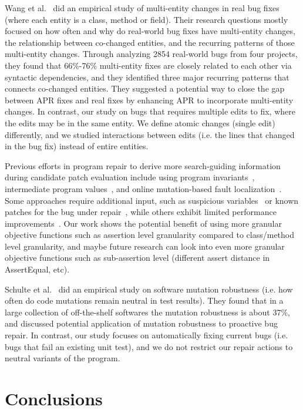 \documentclass[sigconf, timestamp-false, anonymous=true]{acmart}
\begin{document}
Wang et al.~\cite{wang2018} did an empirical study of multi-entity changes in real bug fixes 
(where each entity is a class, method or field). Their research questions mostly focused on 
how often and why do real-world bug fixes have multi-entity changes, the relationship 
between co-changed entities, and the recurring patterns of those multi-entity changes. 
Through analyzing 2854 real-world bugs from four projects, they found that 66\%-76\% 
multi-entity fixes are closely related to each other via syntactic dependencies, 
and they identified three major recurring patterns that connects co-changed entities. 
They suggested a potential way to close the gap between APR fixes and real fixes by 
enhancing APR to incorporate multi-entity changes. In contrast, our study on bugs that
requires multiple edits to fix, where the edits may be in the same entity. We define atomic 
changes (single edit) differently, and we studied interactions between edits 
(i.e. the lines that changed in the bug fix) instead of entire entities.

Previous efforts in program repair to derive more search-guiding information 
during candidate patch evaluation 
include using program invariants~\cite{better-fitness, dinglyu}, 
intermediate program values~\cite{source-code-checkpoint}, 
and online mutation-based fault localization~\cite{mut-analysis}.
Some approaches require additional input, such as suspicious variables~\cite{source-code-checkpoint} 
or known patches for the bug under repair~\cite{better-fitness}, 
while others exhibit limited performance improvements~\cite{dinglyu, mut-analysis}.
Our work shows the potential benefit of using more granular objective functions such as
assertion level granularity compared to class/method level granularity, and maybe
future research can look into even more granular objective functions such as sub-assertion
level (different assert distance in AssertEqual, etc).

Schulte et al.~\cite{schulte} did an empirical study on software mutation robustness 
(i.e. how often do code mutations remain neutral in test results). 
They found that in a large collection of off-the-shelf softwares the mutation robustness is about 37\%, 
and discussed potential application of mutation robustness to proactive bug repair. 
In contrast, our study focuses on automatically fixing current bugs (i.e. bugs that fail an existing unit test), 
and we do not restrict our repair actions to neutral variants of the program.

\section{Conclusions}
\label{sec:conclusions}
\end{document}
